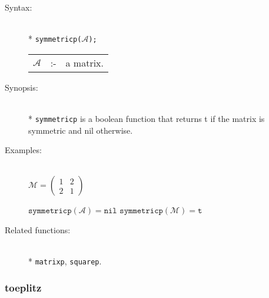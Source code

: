 \begin{description}
\item[Syntax:]\mbox{}\\*
\texttt{symmetricp($\mathcal{A}$);}\\[2mm]
\begin{tabular}{l l l}
$\mathcal{A}$ &:-& a matrix.
\end{tabular}

\item[Synopsis:]\mbox{}\\*
\texttt{symmetricp} is a boolean function that returns t if the
                matrix is symmetric and nil otherwise.

\item[Examples:]\mbox{}\\
  \(\mathcal{M} = \begin{pmatrix} 1 & 2 \\ 2 & 1 \end{pmatrix}\)

  \(\texttt{symmetricp}(\mathcal{A}) = \texttt{nil}\)
  \(\texttt{symmetricp}(\mathcal{M}) = \texttt{t}\)

\item[Related functions:]\mbox{}\\*
\texttt{matrixp}, \texttt{squarep}.
\end{description}


\subsubsection{toeplitz}
\label{linalg:toeplitz}
\hypertarget{operator:TOEPLITZ}{}

